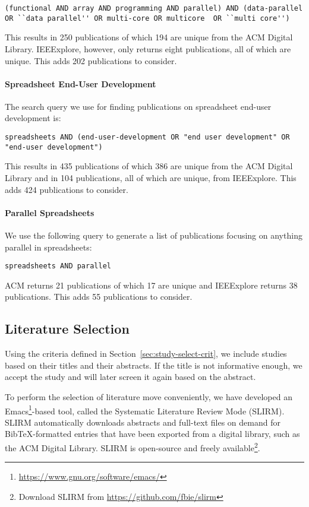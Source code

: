 \documentclass[a4paper]{article}
\begin{document}
\begin{lstlisting}
(functional AND array AND programming AND parallel) AND (data-parallel OR ``data parallel'' OR multi-core OR multicore  OR ``multi core'')
\end{lstlisting}

\noindent This results in 250 publications of which 194 are unique from the ACM Digital Library. IEEExplore, however, only returns eight publications,
all of which are unique. This adds 202 publications to consider.

\paragraph{Spreadsheet End-User Development}

The search query we use for finding publications on spreadsheet end-user development is:

\begin{lstlisting}
spreadsheets AND (end-user-development OR "end user development" OR "end-user development")
\end{lstlisting}

\noindent This results in 435 publications of which 386 are unique from the ACM Digital Library and in 104 publications, all of which are unique, from IEEExplore. This adds 424 publications to consider.

\paragraph{Parallel Spreadsheets}

We use the following query to generate a list of publications focusing on anything parallel in spreadsheets:

\begin{lstlisting}
spreadsheets AND parallel
\end{lstlisting}

\noindent ACM returns 21 publications of which 17 are unique and IEEExplore returns 38 publications. This adds 55 publications to consider.

\subsection{Literature Selection}
\label{sec:literature-selection}

Using the criteria defined in Section~\ref{sec:study-select-crit}, we include studies based on their titles and their abstracts. If the title is not informative enough, we accept the study and will later screen it again based on the abstract.

To perform the selection of literature move conveniently, we have developed an Emacs\footnote{\url{https://www.gnu.org/software/emacs/}}-based tool, called the Systematic Literature Review Mode (SLIRM). SLIRM automatically downloads abstracts and full-text files on demand for BibTeX-formatted entries that have been exported from a digital library, such as the ACM Digital Library. SLIRM is open-source and freely available\footnote{Download SLIRM from
  \url{https://github.com/fbie/slirm}}.
\end{document}
